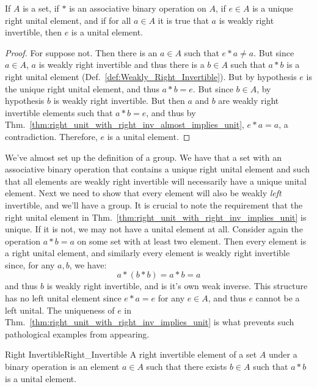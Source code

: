     \begin{theorem}
        \label{thm:right_unit_with_right_inv_implies_unit}%
        If $A$ is a set, if $*$ is an associative binary operation on $A$, if
        $e\in{A}$ is a unique right unital element, and if for all $a\in{A}$ it
        is true that $a$ is weakly right invertible, then $e$ is a unital
        element.
    \end{theorem}
    \begin{proof}
        For suppose not. Then there is an $a\in{A}$ such that $e*a\ne{a}$. But
        since $a\in{A}$, $a$ is weakly right invertible and thus there is a
        $b\in{A}$ such that $a*b$ is a right unital element
        (Def.~\ref{def:Weakly_Right_Invertible}). But by hypothesis $e$ is the
        unique right unital element, and thus $a*b=e$. But since $b\in{A}$,
        by hypothesis $b$ is weakly right invertible. But then $a$ and $b$ are
        weakly right invertible elements such that $a*b=e$, and thus by
        Thm.~\ref{thm:right_unit_with_right_inv_almost_implies_unit}, $e*a=a$,
        a contradiction. Therefore, $e$ is a unital element.
    \end{proof}
    We've almost set up the definition of a group. We have that a set with an
    associative binary operation that contains a unique right unital element
    and such that all elements are weakly right invertible will necessarily have
    a unique unital element. Next we need to show that every element will also
    be weakly \textit{left} invertible, and we'll have a group. It is crucial to
    note the requirement that the right unital element in
    Thm.~\ref{thm:right_unit_with_right_inv_implies_unit} is unique. If it is
    not, we may not have a unital element at all. Consider again the operation
    $a*b=a$ on some set with at least two element. Then every element is a
    right unital element, and similarly every element is weakly right invertible
    since, for any $a,b$, we have:
    \begin{equation}
        a*(b*b)=a*b=a
    \end{equation}
    and thus $b$ is weakly right invertible, and is it's own weak inverse. This
    structure has no left unital element since $e*a=e$ for any $e\in{A}$, and
    thus $e$ cannot be a left unital. The uniqueness of $e$ in
    Thm.~\ref{thm:right_unit_with_right_inv_implies_unit} is what prevents such
    pathological examples from appearing.
    \begin{fdefinition}{Right Invertible}{Right_Invertible}
        A right invertible element of a \gls{set} $A$ under a
        \gls{binary operation} is an element $a\in{A}$ such that there exists
        $b\in{A}$ such that $a*b$ is a \gls{unital element}.
    \end{fdefinition}
